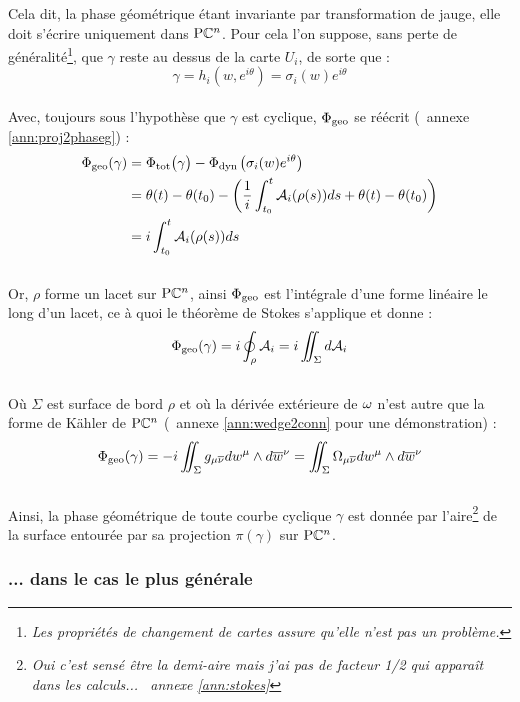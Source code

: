Cela dit, la phase géométrique étant invariante par transformation de jauge, elle doit s'écrire uniquement dans $\text{\normalfont P}\mathbb{C}^{n}$. Pour cela l'on suppose, sans perte de généralité\footnote{\itshape 
	Les propriétés de changement de cartes assure qu'elle n'est pas un problème.
}, que $\gamma$ reste au dessus de la carte $U_i$, de sorte que :
\[\gamma = h_i(w, e^{i\theta}) = \sigma_i(w) e^{i\theta}\]
\\
Avec, toujours sous l'hypothèse que $\gamma$ est cyclique, $\Phi_{\text{\normalfont geo}}$ se réécrit (\cf~annexe \ref{ann:proj2phaseg}) :
\begin{align*}
	\Phi_{\text{\normalfont geo}}(\gamma) &= \Phi_{\text{\normalfont tot}}\big( \gamma \big) - \Phi_{\text{\normalfont dyn}\, }\big( \sigma_i(w) e^{i\theta} \big) \\
	&= \theta(t) - \theta(t_0) - \left( \frac{1}{i}\int_{t_0}^t \mathcal{A}_i(\rho(s)) ds + \theta(t) - \theta(t_0) \right) \\
	&= i \int_{t_0}^t \mathcal{A}_i(\rho(s)) ds
\end{align*}
\\
Or, $\rho$ forme un lacet sur $\text{\normalfont P}\mathbb{C}^{n}$, ainsi $\Phi_{\text{\normalfont geo}}$ est l'intégrale d'une forme linéaire le long d'un lacet, ce à quoi le théorème de Stokes s'applique et donne :
\[\Phi_{\text{\normalfont geo}}(\gamma) = i\oint_\rho \mathcal{A}_i = i\iint_\Sigma d \mathcal{A}_i\]
\\
Où $\Sigma$ est surface de bord $\rho$ et où la dérivée extérieure de $\omega$ n'est autre que la forme de Kähler de $\text{\normalfont P}\mathbb{C}^{n}$ (\cf~annexe \ref{ann:wedge2conn} pour une démonstration) :
\begin{equation} \label{eq:phaseg-aire2PC^n}
	\Phi_{\text{\normalfont geo}}(\gamma) = -i\iint_\Sigma g_{\mu \overline{\nu}} dw^\mu \wedge d\overline{w}^\nu = \iint_{\Sigma} \Omega_{\mu\overline{\nu}} dw^\mu\wedge d\overline{w}^\nu 
\end{equation}
\\
Ainsi, la phase géométrique de toute courbe cyclique $\gamma$ est donnée par l'aire\footnote{\itshape
	Oui c'est sensé être la demi-aire mais j'ai pas de facteur 1/2 qui apparaît dans les calculs... \cf~annexe \ref{ann:stokes}
} de la surface entourée par sa projection $\pi(\gamma)$ sur $\text{\normalfont P}\mathbb{C}^{n}$.
\skipl



\subsubsection{\todo ... dans le cas le plus générale} \label{subsec:phase_g2geode}


